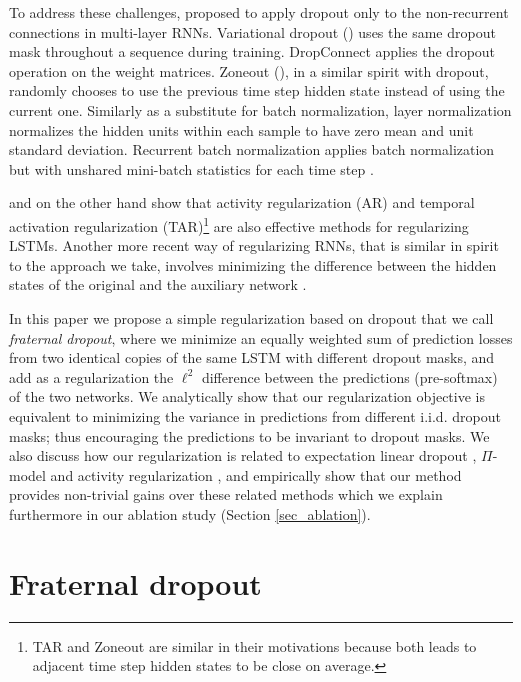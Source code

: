 \documentclass{article} %
\begin{document}
To address these challenges, \citet{zaremba2014recurrent} proposed to apply dropout only to the non-recurrent connections in multi-layer RNNs. Variational dropout (\cite{vdropout}) uses the same dropout mask throughout a sequence during training. DropConnect \citep{wan2013regularization} applies the dropout operation on the weight matrices. Zoneout (\cite{zoneout}), in a similar spirit with dropout, randomly chooses to use the previous time step hidden state instead of using the current one. Similarly as a substitute for batch normalization, layer normalization normalizes the hidden units within each sample to have zero mean and unit standard deviation. Recurrent batch normalization applies batch normalization but with unshared mini-batch statistics for each time step \citep{DBLP:journals/corr/CooijmansBLC16}.

\citet{merity2017regularizing} and \citet{ar_tar} on the other hand show that activity regularization (AR) and temporal activation regularization (TAR)\footnote{TAR and Zoneout are similar in their motivations because both leads to adjacent time step hidden states to be close on average.} are also effective methods for regularizing LSTMs. Another more recent way of regularizing RNNs, that is similar in spirit to the approach we take, involves minimizing the difference between the hidden states of the original and the auxiliary network \cite{serdyuk2017twinnet}.

In this paper we propose a simple regularization based on dropout that we call \emph{fraternal dropout}, where we minimize an equally weighted sum of prediction losses from two identical copies of the same LSTM with different dropout masks, and add as a regularization the $\ell^2$ difference between the predictions (pre-softmax) of the two networks. We analytically show that our regularization objective is equivalent to minimizing the variance in predictions from different i.i.d. dropout masks; thus encouraging the predictions to be invariant to dropout masks. We also discuss how our regularization is related to expectation linear dropout \cite{ma2016dropout}, $\Pi$-model \cite{laine2016temporal} and activity regularization \cite{ar_tar}, and empirically show that our method provides non-trivial gains over these related methods which we explain furthermore in our ablation study (Section \ref{sec_ablation}). 

\section{Fraternal dropout}
\label{sec_fd}
\end{document}
